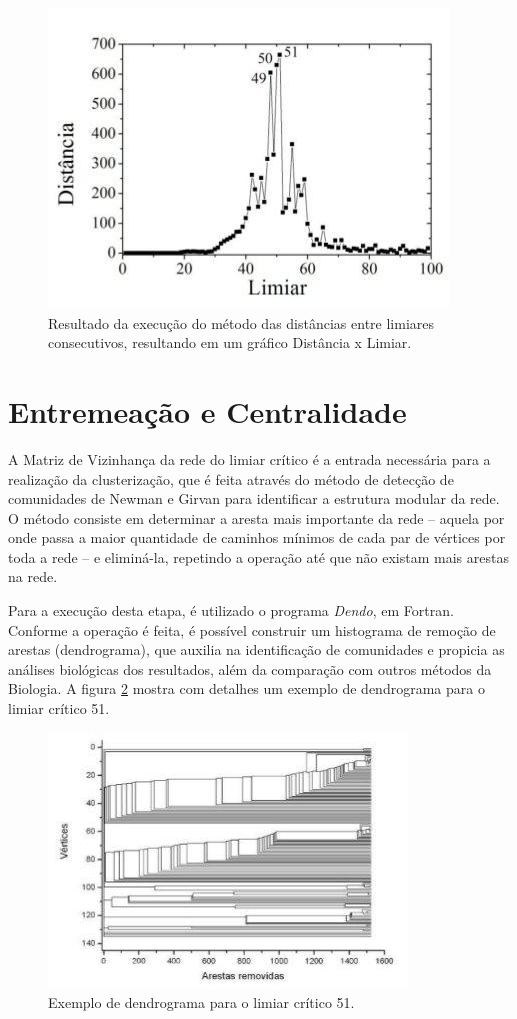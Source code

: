 \begin{figure}
\centering
\includegraphics[scale=0.58]{distancia}
\caption{Resultado da execução do método das distâncias entre limiares consecutivos, resultando em um gráfico Distância x Limiar.}
\label{fig:distancia}
\end{figure}

\section{Entremeação e Centralidade} \label{sec:entremeacao}

A Matriz de Vizinhança da rede do limiar crítico é a entrada necessária para a realização da clusterização, que é feita através do método de detecção
de comunidades de Newman e Girvan \cite{newman2004} para identificar a estrutura modular da rede. O método consiste em determinar a aresta mais importante
da rede – aquela por onde passa a maior quantidade de caminhos mínimos de cada par de vértices por toda a rede – e eliminá-la, repetindo a operação
até que não existam mais arestas na rede.

Para a execução desta etapa, é utilizado o programa \textit{Dendo}, em Fortran. Conforme a operação é feita, é possível construir um histograma de remoção
de arestas (dendrograma), que auxilia na identificação de comunidades e propicia as análises biológicas dos resultados, além da comparação com outros
métodos da Biologia. A figura \ref{fig:dendrograma} mostra com detalhes um exemplo de dendrograma para o limiar crítico 51.\newline

\begin{figure}
\centering
\includegraphics[scale=0.73]{dendrograma}
\caption{Exemplo de dendrograma para o limiar crítico 51.}
\label{fig:dendrograma}
\end{figure}

